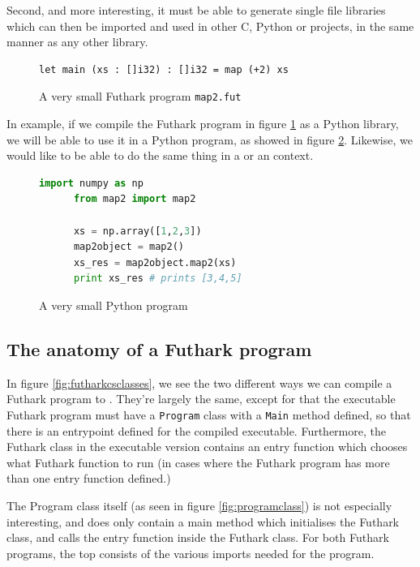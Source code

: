Second, and more interesting, it must be able to generate single file libraries
which can then be imported and used in other C, Python or \csharp{} projects, in
the same manner as any other library.

\begin{figure}[h]
  \centering
    \begin{lstlisting}[language=Futhark]
      let main (xs : []i32) : []i32 = map (+2) xs
    \end{lstlisting}
  \caption{A very small Futhark program \texttt{map2.fut}}
  \label{fig:smallfut}
\end{figure}
In example, if we compile the Futhark program in figure \ref{fig:smallfut} as a
Python library, we will be able to use it in a Python program, as showed in figure \ref{fig:smallpython}.
Likewise, we would like to be able to do the same thing in a \csharp{} or an
\fsharp{} context.
\begin{figure}[h]
  \centering
    \begin{lstlisting}[language=python]
      import numpy as np
      from map2 import map2

      xs = np.array([1,2,3])
      map2object = map2()
      xs_res = map2object.map2(xs)
      print xs_res # prints [3,4,5]
    \end{lstlisting}
  \caption{A very small Python program}
  \label{fig:smallpython}
\end{figure}

\subsection{The anatomy of a Futhark \csharp{} program}
In figure \ref{fig:futharkcsclasses}, we see the two different ways we can
compile a Futhark program to \csharp{}. They're largely the same, except for
that the executable Futhark program must have a \texttt{Program} class with a
\texttt{Main} method defined, so that there is an entrypoint defined for the
compiled executable. Furthermore, the Futhark class in the executable version
contains an entry function which chooses what Futhark function to run (in cases
where the Futhark program has more than one entry function defined.) 

The Program class itself (as seen in figure \ref{fig:programclass}) is not especially
interesting, and does only contain a main method which initialises the Futhark
class, and calls the entry function inside the Futhark class.
For both Futhark programs, the top consists of the various imports needed for
the program.

